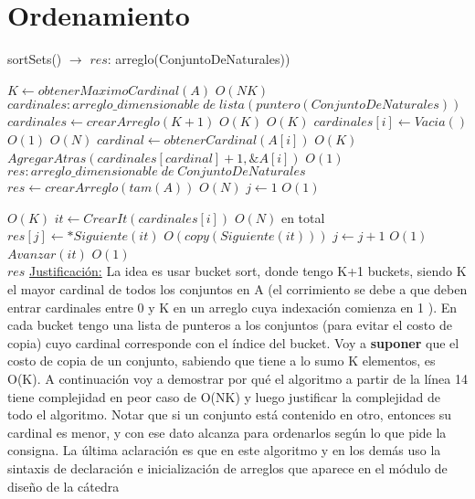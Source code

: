 \documentclass[10pt, a4paper]{article}
\begin{document}



\maketitle

\section{Ordenamiento}

\begin{algorithm}[H]{sortSets() $\to$ $res$: arreglo(ConjuntoDeNaturales))}	
	\begin{algorithmic}[1]
			 \State $K \gets obtenerMaximoCardinal(A)$			\Comment $O(NK)$
			 \State $cardinales: arreglo\_dimensionable\; de\; lista(puntero(ConjuntoDeNaturales))$
			 \State $cardinales \gets crearArreglo(K + 1)$			\Comment $O(K)$
			 			\Comment $O(K)$
			 	\State $cardinales[i]\gets Vacia()$			\Comment $O(1)$
			 \EndFor
			 			\Comment $O(N)$
			 	\State $cardinal \gets obtenerCardinal(A[i])$			\Comment $O(K)$
			 	\State $AgregarAtras(cardinales[cardinal] + 1, \&A[i])$			\Comment $O(1)$
			 \EndFor
			 \State $res: arreglo\_dimensionable\; de\; ConjuntoDeNaturales$
			 \State $res \gets crearArreglo(tam(A))$	\Comment $O(N)$
			 \State $j \gets 1$                    \Comment $O(1)$
    	
    						\Comment $O(K)$
    			\State $it \gets CrearIt(cardinales[i])$
    						\Comment $O(N)$ en total
			 		\State $res[j]\gets *Siguiente(it)$	\Comment $O(copy(Siguiente(it)))$
			 		\State $j\gets j+1$	\Comment $O(1)$
			 		\State $Avanzar(it)$	\Comment $O(1)$
			 	\EndWhile
			\EndFor \\
			\Return $res$
		\medskip
		\Statex \underline{Justificación:} La idea es usar bucket sort, donde tengo K+1 buckets, siendo K el mayor cardinal de todos los conjuntos en A (el corrimiento se debe a que deben entrar cardinales entre 0 y K en un arreglo cuya indexación comienza en 1 ). En cada bucket tengo una lista de punteros a los conjuntos (para evitar el costo de copia) cuyo cardinal corresponde con el índice del bucket. Voy a \textbf{suponer} que el costo de copia de un conjunto, sabiendo que tiene a lo sumo K elementos, es O(K). A continuación voy a demostrar por qué el algoritmo a partir de la línea 14 tiene complejidad en peor caso de O(NK) y luego justificar la complejidad de todo el algoritmo. Notar que si un conjunto está contenido en otro, entonces su cardinal es menor, y con ese dato alcanza para ordenarlos según lo que pide la consigna. La última aclaración es que en este algoritmo y en los demás uso la sintaxis de declaración e inicialización de arreglos que aparece en el módulo de diseño de la cátedra
    \end{algorithmic}
\end{algorithm}	
\end{document}
